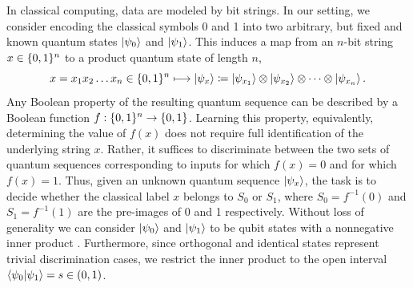 In classical computing, data are modeled by bit strings.
In our setting, we consider encoding the classical symbols 0 and 1 into two arbitrary, but fixed and known quantum states $\ket{\psi_0}$ and $\ket{\psi_1}$.
This induces a map from an $n$-bit string $x \in \{ 0, 1 \}^n$ to a product quantum state of length $n$,
\begin{equation}
    x = x_1 x_2 \ldots x_n \in \{ 0, 1 \}^n \longmapsto  \ket{\psi_x} \coloneqq \ket{\psi_{x_1}} \otimes \ket{\psi_{x_2}} \otimes \cdots \otimes \ket{\psi_{x_n}}.
\end{equation}
Any Boolean property of the resulting quantum sequence can be described by a Boolean function $f:\{ 0, 1 \}^n \to \{ 0, 1 \}$.
Learning this property, equivalently, determining the value of $f(x)$ does not require full identification of the underlying string $x$.
Rather, it suffices to discriminate between the two sets of quantum sequences corresponding to inputs for which $f(x)=0$ and for which $f(x)=1$.
Thus, given an unknown quantum sequence $\ket{\psi_{x}}$, the task is to decide whether the classical label $x$ belongs to $S_0$ or $S_1$, where $S_0 = f^{-1}(0)$ and $S_1 = f^{-1}(1)$ are the pre-images of 0 and 1 respectively.
Without loss of generality we can consider $\ket{\psi_0}$ and $\ket{\psi_1}$ to be qubit states with a nonnegative inner product \cite[Section~3.1]{barnett2009quantum}.
Furthermore, since orthogonal and identical states represent trivial discrimination cases, we restrict the inner product to the open interval $\braket{\psi_0}{\psi_1} = s \in (0,1)$.

